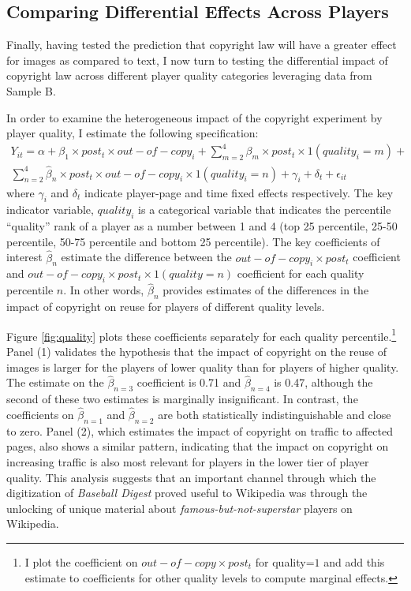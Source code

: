 \documentclass[11pt]{article}
\begin{document}
\subsection{Comparing Differential Effects Across Players}
\label{sec:diff2}


Finally, having tested the prediction that copyright law will have a greater effect for images as compared to text, I now turn to testing the differential impact of copyright law across different player quality categories leveraging data from Sample B. 

In order to examine the heterogeneous impact of the copyright experiment by player quality, I estimate the following specification:
\begin{align*}
Y_{it} = \alpha + \beta_1 \times post_t \times out-of-copy_i + \sum\limits_{m=2}^4 \beta_m \times post_t \times 1(quality_i=m) + \\ \sum\limits_{n=2}^4 \hat{\beta}_n \times post_t \times out-of-copy_i \times 1(quality_i=n) + \gamma_i+ \delta_t + \epsilon_{it}
\end{align*}
where $\gamma_i$ and $\delta_t$ indicate player-page and time fixed effects respectively. The key indicator variable, $quality_i$ is a categorical variable that indicates the percentile ``quality'' rank of a player as a number between 1 and 4 (top 25 percentile, 25-50 percentile, 50-75 percentile and bottom 25 percentile). The key coefficients of interest $\hat{\beta}_n$ estimate the difference between the $out-of-copy_i \times post_t$ coefficient and $out-of-copy_i \times post_t \times 1(quality=n)$ coefficient for each quality percentile $n$. In other words, $\hat{\beta}_n$ provides estimates of the differences in the impact of copyright on reuse for players of different quality levels.

Figure \ref{fig:quality} plots these coefficients separately for each quality percentile.\footnote{I plot the coefficient on $out-of-copy \times post_t$ for quality=$1$ and add this estimate to coefficients for other quality levels to compute marginal effects.} Panel (1) validates the hypothesis that the impact of copyright on the reuse of images is larger for the players of lower quality than for players of higher quality. The estimate on the $\hat{\beta}_{n=3}$ coefficient is 0.71 and $\hat{\beta}_{n=4}$ is 0.47, although the second of these two estimates is marginally insignificant. In contrast, the coefficients on $\hat{\beta}_{n=1}$ and $\hat{\beta}_{n=2}$ are both statistically indistinguishable and close to zero. Panel (2), which estimates the impact of copyright on traffic to affected pages, also shows a similar pattern, indicating that the impact on copyright on increasing traffic is also most relevant for players in the lower tier of player quality. This analysis suggests that an important channel through which the digitization of \emph{Baseball Digest} proved useful to Wikipedia was through the unlocking of unique material about \emph{famous-but-not-superstar} players on Wikipedia. 
\end{document}
